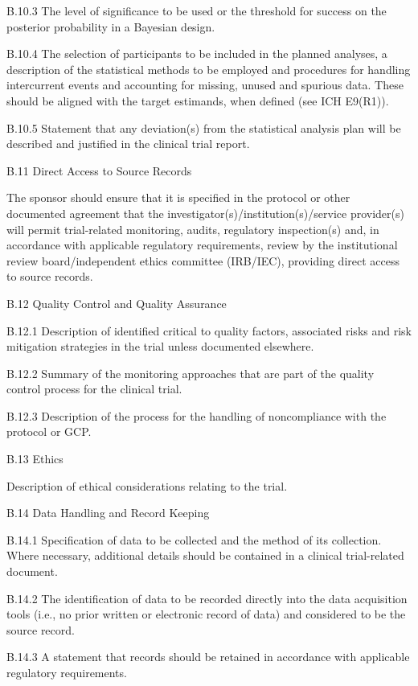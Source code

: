 \documentclass[11pt]{article}
\begin{document}
B.10.3 The level of significance to be used or the threshold for success on the posterior probability in a Bayesian design.


B.10.4 The selection of participants to be included in the planned analyses, a description of the statistical methods to be employed and procedures for handling intercurrent events and accounting for missing, unused and spurious data. These should be aligned with the target estimands, when defined (see ICH E9(R1)).


B.10.5 Statement that any deviation(s) from the statistical analysis plan will be described and justified in the clinical trial report.


B.11 Direct Access to Source Records


The sponsor should ensure that it is specified in the protocol or other documented agreement that the investigator(s)/institution(s)/service provider(s) will permit trial-related monitoring, audits, regulatory inspection(s) and, in accordance with applicable regulatory requirements, review by the institutional review board/independent ethics committee (IRB/IEC), providing direct access to source records.


B.12 Quality Control and Quality Assurance


B.12.1 Description of identified critical to quality factors, associated risks and risk mitigation strategies in the trial unless documented elsewhere.


B.12.2 Summary of the monitoring approaches that are part of the quality control process for the clinical trial.


B.12.3 Description of the process for the handling of noncompliance with the protocol or GCP.


B.13 Ethics


Description of ethical considerations relating to the trial.


B.14 Data Handling and Record Keeping


B.14.1 Specification of data to be collected and the method of its collection. Where necessary, additional details should be contained in a clinical trial-related document.


B.14.2 The identification of data to be recorded directly into the data acquisition tools (i.e., no prior written or electronic record of data) and considered to be the source record.


B.14.3 A statement that records should be retained in accordance with applicable regulatory requirements.
\end{document}
